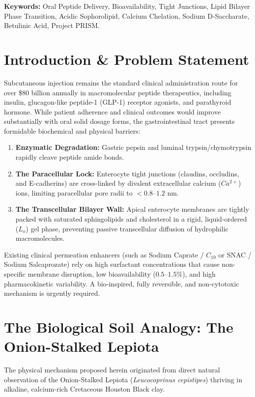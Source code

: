 \documentclass[10pt,twocolumn,letterpaper]{article}
\begin{document}
\noindent \textbf{Keywords:} Oral Peptide Delivery, Bioavailability, Tight Junctions, Lipid Bilayer Phase Transition, Acidic Sophorolipid, Calcium Chelation, Sodium D-Saccharate, Betulinic Acid, Project PRISM.

\section{Introduction \& Problem Statement}

Subcutaneous injection remains the standard clinical administration route for over \$80 billion annually in macromolecular peptide therapeutics, including insulin, glucagon-like peptide-1 (GLP-1) receptor agonists, and parathyroid hormone. While patient adherence and clinical outcomes would improve substantially with oral solid dosage forms, the gastrointestinal tract presents formidable biochemical and physical barriers:

\begin{enumerate}[noitemsep]
    \item \textbf{Enzymatic Degradation:} Gastric pepsin and luminal trypsin/chymotrypsin rapidly cleave peptide amide bonds.
    \item \textbf{The Paracellular Lock:} Enterocyte tight junctions (claudins, occludins, and E-cadherins) are cross-linked by divalent extracellular calcium ($Ca^{2+}$) ions, limiting paracellular pore radii to $<0.8\text{--}1.2\text{ nm}$.
    \item \textbf{The Transcellular Bilayer Wall:} Apical enterocyte membranes are tightly packed with saturated sphingolipids and cholesterol in a rigid, liquid-ordered ($L_o$) gel phase, preventing passive transcellular diffusion of hydrophilic macromolecules.
\end{enumerate}

Existing clinical permeation enhancers (such as Sodium Caprate / $C_{10}$ or SNAC / Sodium Salcaprozate) rely on high surfactant concentrations that cause non-specific membrane disruption, low bioavailability ($0.5\text{--}1.5\%$), and high pharmacokinetic variability. A bio-inspired, fully reversible, and non-cytotoxic mechanism is urgently required.

\section{The Biological Soil Analogy: The Onion-Stalked Lepiota}

The physical mechanism proposed herein originated from direct natural observation of the Onion-Stalked Lepiota (\textit{Leucocoprinus cepistipes}) thriving in alkaline, calcium-rich Cretaceous Houston Black clay. 
\end{document}
